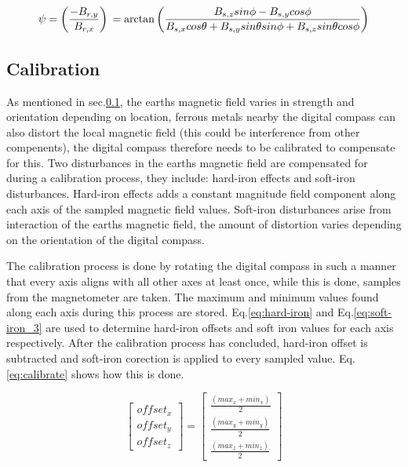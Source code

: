 \begin{equation}
    \label{eq:yaw}
    \psi =  \left(\frac{-B_{r,y}}{B_{r,x}}\right) \newline
        =\arctan \left(\frac{B_{s,z} sin\phi - B_{s,y} cos\phi }  {B_{s,x} cos\theta + B_{s,y} sin\theta sin\phi + B_{s,z} sin\theta cos\phi}\right)
\end{equation}

\subsection{Calibration}
As mentioned in sec.\ref{}, the earths magnetic field varies in strength and orientation depending on location, ferrous metals nearby the digital compass can also distort the local magnetic field
(this could be interference from other compenents), the digital compass therefore needs to be calibrated to compensate for this. Two disturbances in the 
earths magnetic field are compensated for during a calibration process, they include: hard-iron effects and soft-iron disturbances. Hard-iron effects adds a constant magnitude field component along
each axis of the sampled magnetic field values. Soft-iron disturbances arise from interaction of the earths magnetic field, the amount of distortion varies depending on the orientation of the digital 
compass. 

The calibration process is done by rotating the digital compass in such a manner that every axis aligns with all other axes at least once, while this is done, samples from the magnetometer 
are taken. The maximum and minimum values found along each axis during this process are stored. Eq.\ref{eq:hard-iron} and Eq.\ref{eq:soft-iron_3} are used to determine hard-iron offsets 
and soft iron values for each axis respectively. After the calibration process has concluded, hard-iron offset is subtracted and soft-iron corection is applied to every sampled value. Eq.\ref{eq:calibrate}
shows how this is done.

\begin{equation}
    \label{eq:hard-iron}
    \begin{bmatrix} offset_{x} \\ offset_{y} \\ offset_{z} \end{bmatrix} = \begin{bmatrix} \frac{(max_{x} + min_{x})}{2} \\ \frac{(max_{y} + min_{y})}{2} \\ \frac{(max_{z} + min_{z})}{2}\end{bmatrix}
\end{equation}


